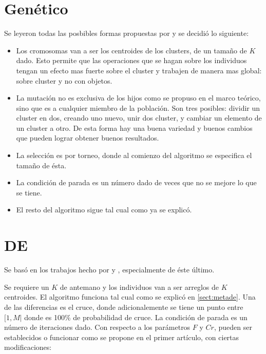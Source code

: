 \section{Gen\'etico}  \label{chap:igenetico}

Se leyeron todas las posbibles formas propuestas por \cite{HrCaFr2009} y se decidi\'o
lo siguiente:

\begin{itemize}

\item Los cromosomas van a ser los centroides de los clusters, de un tama\~no de $K$
dado. Esto permite que las operaciones que se hagan sobre los individuos tengan
un efecto mas fuerte sobre el cluster y trabajen de manera mas global: sobre cluster y
no con objetos.

\item La mutaci\'on no es exclusiva de los hijos como se propuso en el marco te\'orico,
sino que es a cualquier miembro de la poblaci\'on. Son tres posibles: dividir un cluster
en dos, creando uno nuevo, unir dos cluster, y cambiar un elemento de un cluster a otro.
De esta forma hay una buena variedad y buenos cambios que pueden lograr obtener buenos
resultados.

\item La selecci\'on es por torneo, donde al comienzo del algoritmo se especifica 
el tama\~no de \'esta.

\item La condici\'on de parada es un n\'umero dado de veces que no se mejore lo 
que se tiene.

\item El resto del algoritmo sigue tal cual como ya se explic\'o.

\end{itemize}

\section{DE}  \label{chap:ide}

Se bas\'o en los trabajos hecho por \cite{SwAjAm2008} y \cite{OmEnSa2005}, especialmente
de \'este \'ultimo.

Se requiere un $K$ de antemano y los individuos van a ser arreglos de $K$ centroides.
El algoritmo funciona tal cual como se explic\'o en \ref{sect:metade}. Una de las diferencias es
el cruce, donde adicionalemente se tiene
un punto entre $[1,M|$ donde es 100\% de probabilidad de cruce. La condici\'on
de parada es un n\'umero de iteraciones dado. Con respecto
a los par\'ametros $F$ y $Cr$, pueden ser establecidos o funcionar como se propone
en el primer art\'iculo, con ciertas modificaciones:

